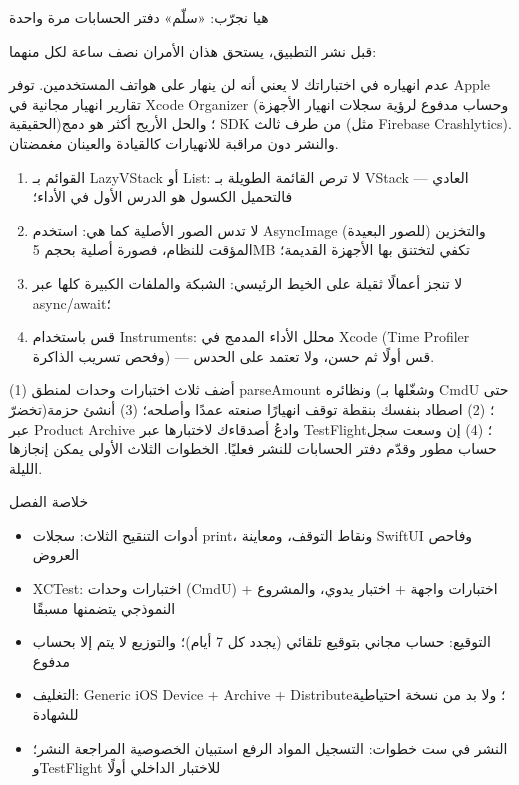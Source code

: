 \begin{tcbpractice}{هيا نجرّب: «سلّم» دفتر الحسابات مرة واحدة}

قبل نشر التطبيق، يستحق هذان الأمران نصف ساعة لكل منهما:


عدم انهياره في اختباراتك لا يعني أنه لن ينهار على هواتف المستخدمين. توفر Apple تقارير انهيار مجانية في Xcode Organizer (وحساب مدفوع لرؤية سجلات انهيار الأجهزة الحقيقية)؛ والحل الأريح أكثر هو دمج SDK من طرف ثالث (مثل Firebase Crashlytics). والنشر دون مراقبة للانهيارات كالقيادة والعينان مغمضتان.


\begin{enumerate}
  \item القوائم بـ LazyVStack أو List: لا ترص القائمة الطويلة بـ VStack العادي — فالتحميل الكسول هو الدرس الأول في الأداء؛
  \item لا تدس الصور الأصلية كما هي: استخدم AsyncImage (للصور البعيدة) والتخزين المؤقت للنظام، فصورة أصلية بحجم 5MB تكفي لتختنق بها الأجهزة القديمة؛
  \item لا تنجز أعمالًا ثقيلة على الخيط الرئيسي: الشبكة والملفات الكبيرة كلها عبر async/await؛
  \item قس باستخدام Instruments: محلل الأداء المدمج في Xcode (Time Profiler وفحص تسريب الذاكرة) — قس أولًا ثم حسن، ولا تعتمد على الحدس.
\end{enumerate}

(1) أضف ثلاث اختبارات وحدات لمنطق parseAmount ونظائره (وشغّلها بـ CmdU حتى تخضرّ)؛ (2) اصطاد بنفسك بنقطة توقف انهيارًا صنعته عمدًا وأصلحه؛ (3) أنشئ حزمة عبر Product Archive وادعُ أصدقاءك لاختبارها عبر TestFlight؛ (4) إن وسعت سجل حساب مطور وقدّم دفتر الحسابات للنشر فعليًا. الخطوات الثلاث الأولى يمكن إنجازها الليلة.

\end{tcbpractice}

\begin{tcbsummary}{خلاصة الفصل}
\begin{itemize}
  \item أدوات التنقيح الثلاث: سجلات print، ونقاط التوقف، ومعاينة SwiftUI وفاحص العروض
  \item XCTest: اختبارات وحدات (CmdU) + اختبارات واجهة + اختبار يدوي، والمشروع النموذجي يتضمنها مسبقًا
  \item التوقيع: حساب مجاني بتوقيع تلقائي (يجدد كل 7 أيام)؛ والتوزيع لا يتم إلا بحساب مدفوع
  \item التغليف: Generic iOS Device + Archive + Distribute؛ ولا بد من نسخة احتياطية للشهادة
  \item النشر في ست خطوات: التسجيل المواد الرفع استبيان الخصوصية المراجعة النشر؛ وTestFlight للاختبار الداخلي أولًا
\end{itemize}

\end{tcbsummary}
